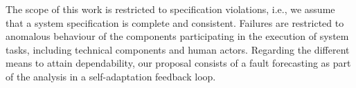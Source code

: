 
The scope of this work is restricted to specification violations, i.e., we assume that a system specification is complete and consistent. Failures are restricted to anomalous behaviour of the components participating in the execution of system tasks, including technical components and human actors. Regarding the different means to attain dependability, our proposal consists of a fault forecasting as part of the analysis in a self-adaptation feedback loop.


